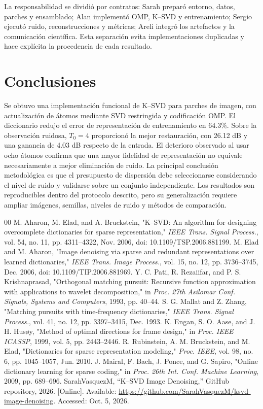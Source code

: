 \documentclass[conference]{IEEEtran}
\begin{document}
La responsabilidad se dividió por contratos: Sarah preparó entorno, datos, parches y ensamblado; Alan implementó OMP, K--SVD y entrenamiento; Sergio ejecutó ruido, reconstrucciones y métricas; Areli integró los artefactos y la comunicación científica. Esta separación evita implementaciones duplicadas y hace explícita la procedencia de cada resultado.

\section{Conclusiones}
Se obtuvo una implementación funcional de K--SVD para parches de imagen, con actualización de átomos mediante SVD restringida y codificación OMP. El diccionario redujo el error de representación de entrenamiento en $64.3\%$. Sobre la observación ruidosa, $T_0=4$ proporcionó la mejor restauración, con 26.12 dB y una ganancia de 4.03 dB respecto de la entrada. El deterioro observado al usar ocho átomos confirma que una mayor fidelidad de representación no equivale necesariamente a mejor eliminación de ruido. La principal conclusión metodológica es que el presupuesto de dispersión debe seleccionarse considerando el nivel de ruido y validarse sobre un conjunto independiente. Los resultados son reproducibles dentro del protocolo descrito, pero su generalización requiere ampliar imágenes, semillas, niveles de ruido y métodos de comparación.

\begin{thebibliography}{00}
 M. Aharon, M. Elad, and A. Bruckstein, "K--SVD: An algorithm for designing overcomplete dictionaries for sparse representation," \emph{IEEE Trans. Signal Process.}, vol. 54, no. 11, pp. 4311--4322, Nov. 2006, doi: 10.1109/TSP.2006.881199.
 M. Elad and M. Aharon, "Image denoising via sparse and redundant representations over learned dictionaries," \emph{IEEE Trans. Image Process.}, vol. 15, no. 12, pp. 3736--3745, Dec. 2006, doi: 10.1109/TIP.2006.881969.
 Y. C. Pati, R. Rezaiifar, and P. S. Krishnaprasad, "Orthogonal matching pursuit: Recursive function approximation with applications to wavelet decomposition," in \emph{Proc. 27th Asilomar Conf. Signals, Systems and Computers}, 1993, pp. 40--44.
 S. G. Mallat and Z. Zhang, "Matching pursuits with time-frequency dictionaries," \emph{IEEE Trans. Signal Process.}, vol. 41, no. 12, pp. 3397--3415, Dec. 1993.
 K. Engan, S. O. Aase, and J. H. Husøy, "Method of optimal directions for frame design," in \emph{Proc. IEEE ICASSP}, 1999, vol. 5, pp. 2443--2446.
 R. Rubinstein, A. M. Bruckstein, and M. Elad, "Dictionaries for sparse representation modeling," \emph{Proc. IEEE}, vol. 98, no. 6, pp. 1045--1057, Jun. 2010.
 J. Mairal, F. Bach, J. Ponce, and G. Sapiro, "Online dictionary learning for sparse coding," in \emph{Proc. 26th Int. Conf. Machine Learning}, 2009, pp. 689--696.
 SarahVasquezM, ``K--SVD Image Denoising,'' GitHub repository, 2026. [Online]. Available: \url{https://github.com/SarahVasquezM/ksvd-image-denoising}. Accessed: Oct. 5, 2026.
\end{thebibliography}
\end{document}
